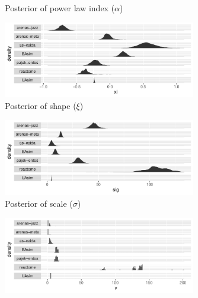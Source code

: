 \documentclass[
  10pt,
  a4paper,
]{scrreprt}
\theoremstyle{plain}
\theoremstyle{plain}
\theoremstyle{definition}
\theoremstyle{plain}
\theoremstyle{remark}
\begin{document}
{\begin{figure}[H]
\caption{\label{fig-alpha}Posterior of power law index (\(\alpha\))}

\end{figure}

\begin{figure}[H]

{\centering \includegraphics[width=0.75\textwidth,height=\textheight]{doc_files/figure-pdf/fig-shape-1.pdf}

}

\caption{\label{fig-shape}Posterior of shape (\(\xi\))}

\end{figure}

\begin{figure}[H]

{\centering \includegraphics[width=0.75\textwidth,height=\textheight]{doc_files/figure-pdf/fig-scale-1.pdf}

}

\caption{\label{fig-scale}Posterior of scale (\(\sigma\))}

\end{figure}

\begin{figure}[H]

{\centering \includegraphics[width=0.75\textwidth,height=\textheight]{doc_files/figure-pdf/fig-thresh-1.pdf}

}
\end{figure}}
\end{document}
